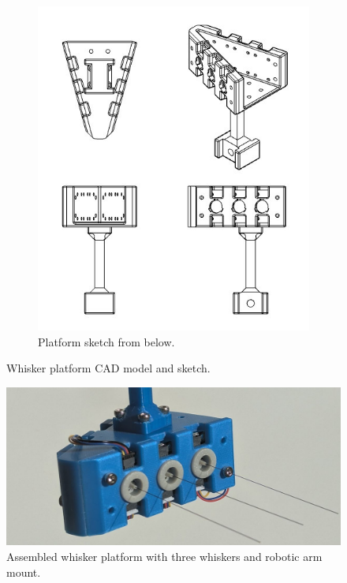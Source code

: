 \begin{figure}[ht]
\begin{subfigure}[b]{0.45\textwidth}
        \includegraphics[width=\linewidth]{figures/platform-sketch}
        \caption{Platform sketch from below.}
    \end{subfigure}
    \caption{Whisker platform CAD model and sketch.}
    \label{fig:platform}
\end{figure}

\begin{figure}[htb]
    \centering
    \includegraphics[width=\textwidth]{figures/platform}
    \caption{Assembled whisker platform with three whiskers and robotic arm mount.}
    \label{fig:whisker_platform}
\end{figure}


